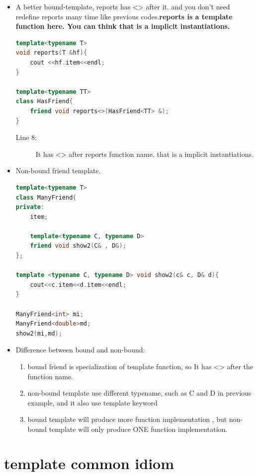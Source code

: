 \documentclass[a4paper,11pt,twoside]{book}
\begin{document}
\begin{itemize}
	\item A better bound-template, reports has <> after it.  and you don't need redefine reports many time like previous codes.\textbf{reports is a template function here. You can think that is a implicit instantiations. }
\begin{lstlisting}[frame=single, language=c++]
template<typename T>
void reports(T &hf){
	cout <<hf.item<<endl;
}

template<typename TT>
class HasFriend{
	friend void reports<>(HasFriend<TT> &);
}
\end{lstlisting}
\begin{description}
	\item[Line 8:] It has <> after reports function name. that is a implicit instantiations.
\end{description}

	\item Non-bound friend template.
\begin{lstlisting}[frame=single, language=c++]
template<typename T>
class ManyFriend{
private:
	item;
	
	template<typename C, typename D>
	friend void show2(C& , D&);
};
	
template <typename C, typename D> void show2(c& c, D& d){
	cout<<c.item<<d.item<<endl;
}
	
ManyFriend<int> mi;
ManyFriend<double>md;
show2(mi,md);
\end{lstlisting}
	
	\item Difference between bound and non-bound:
	
	\begin{enumerate}
		\item bound friend is specialization of template function, so It has <> after the function name.
		
		\item non-bound template use different typename, such as C and D in previous example, and it also use template keyword
		
		\item bound template will produce more function implementation , but non-bound template will only produce ONE function implementation.
	\end{enumerate}
\end{itemize}

\section{template common idiom}
\end{document}
